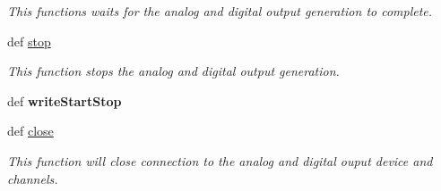 \begin{DoxyCompactItemize}
\begin{DoxyCompactList}\small\item\em This functions waits for the analog and digital output generation to complete. \end{DoxyCompactList}\item 
def \hyperlink{class_chassis_8git_1_1_waveform_generator_1_1_waveform_generator_adfad9d232df552a816806584d30fd9ab}{stop}
\begin{DoxyCompactList}\small\item\em This function stops the analog and digital output generation. \end{DoxyCompactList}\item 
\hypertarget{class_chassis_8git_1_1_waveform_generator_1_1_waveform_generator_a1c55fd504c3c7918e507b679ffc1ab33}{def {\bfseries write\-Start\-Stop}}\label{class_chassis_8git_1_1_waveform_generator_1_1_waveform_generator_a1c55fd504c3c7918e507b679ffc1ab33}

\item 
def \hyperlink{class_chassis_8git_1_1_waveform_generator_1_1_waveform_generator_a4b18a2741c804df25b8597d18152f064}{close}
\begin{DoxyCompactList}\small\item\em This function will close connection to the analog and digital ouput device and channels. \end{DoxyCompactList}\end{DoxyCompactItemize}
